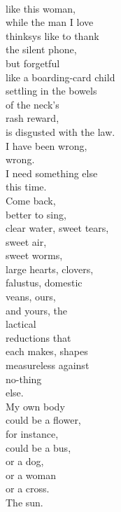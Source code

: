 \documentclass[smalldemyvopaper,11pt,twoside,onecolumn,openright,extrafontsizes]{memoir}
\begin{document}
\\like this woman,
\\while the man I love
\\thinksys like to thank
\\the silent phone,
\\but forgetful
\\like a boarding-card child
\\settling in the bowels
\\of the neck's
\\rash reward,
\\is disgusted with the law.
\\I have been wrong,
\\wrong.
\\I need something else
\\this time.
\\Come back,
\\better to sing,
\\clear water, sweet tears,
\\sweet air,
\\sweet worms,
\\large hearts, clovers,
\\falustus, domestic
\\veans, ours,
\\and yours, the
\\lactical
\\reductions that
\\each makes, shapes
\\measureless against
\\no-thing
\\else.
\\My own body
\\could be a flower,
\\for instance,
\\could be a bus,
\\or a dog,
\\or a woman
\\or a cross.
\\The sun.
\end{document}
